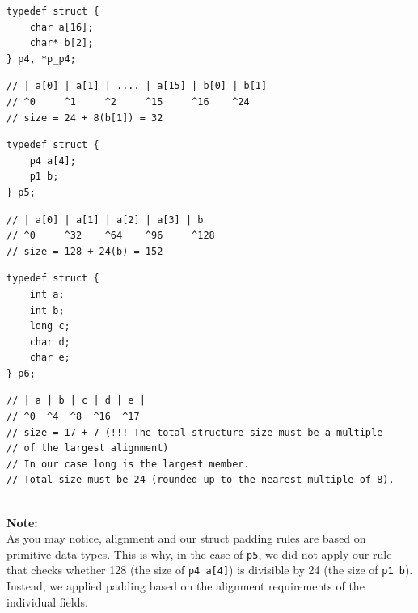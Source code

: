\documentclass{article}
\begin{document}
\vspace{1em}

\noindent\begin{minipage}{0.29\textwidth}
\begin{lstlisting}
typedef struct {
    char a[16];
    char* b[2];
} p4, *p_p4;
\end{lstlisting}
\end{minipage}
\begin{minipage}{0.29\textwidth}
\begin{verbatim}
// | a[0] | a[1] | .... | a[15] | b[0] | b[1] 
// ^0     ^1     ^2     ^15     ^16    ^24
// size = 24 + 8(b[1]) = 32
\end{verbatim}
\end{minipage}

\vspace{1em}

\noindent\begin{minipage}{0.29\textwidth}
\begin{lstlisting}
typedef struct {
    p4 a[4];
    p1 b;
} p5;
\end{lstlisting}
\end{minipage}
\begin{minipage}{0.29\textwidth}
\begin{verbatim}
// | a[0] | a[1] | a[2] | a[3] | b
// ^0     ^32    ^64    ^96     ^128 
// size = 128 + 24(b) = 152
\end{verbatim}
\end{minipage}

\vspace{1em}

\noindent\begin{minipage}{0.29\textwidth}
\begin{lstlisting}
typedef struct {
    int a;
    int b;
    long c;
    char d;
    char e;
} p6;
\end{lstlisting}
\end{minipage}
\begin{minipage}{0.29\textwidth}
\begin{verbatim}
// | a | b | c | d | e |
// ^0  ^4  ^8  ^16  ^17
// size = 17 + 7 (!!! The total structure size must be a multiple
// of the largest alignment)
// In our case long is the largest member. 
// Total size must be 24 (rounded up to the nearest multiple of 8).
\end{verbatim}
\end{minipage}
\\
\noindent\textbf{Note:} \\
As you may notice, alignment and our struct padding rules are based on primitive data types. This is why, in the case of \texttt{p5}, we did not apply our rule that checks whether 128 (the size of \texttt{p4 a[4]}) is divisible by 24 (the size of \texttt{p1 b}). Instead, we applied padding based on the alignment requirements of the individual fields.
\end{document}
